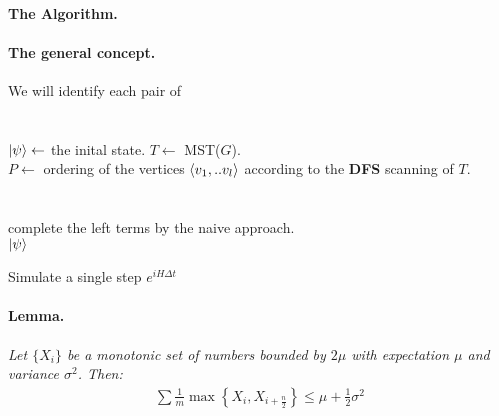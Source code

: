 \documentclass{article}
\begin{document}
\begin{multicols*}{2}
\paragraph{The Algorithm.}

\paragraph{The general concept.} We will identify each pair of  


\paragraph{}

\begin{algorithm}[H]
\SetAlgoLined
\ \\ 
\( \ket{\psi} \leftarrow \) the inital state.
 \(T  \leftarrow\) MST(\(G\)). \\
 \(P \leftarrow \) ordering of the vertices \( \braket{v_{1} , .. v_{l}}\) according to the \textbf{DFS} scanning of \(T\). \\
 \ \\ 
 \ \\
 complete the left terms by the naive approach. \\
 \Return \( \ket{\psi} \)
 \caption{Simulate a single step \(e^{iH\Delta t}\)}
\end{algorithm}


\paragraph{Lemma.} \textit{Let \(\{X_{i}\}\) be a monotonic set of numbers bounded by \(2\mu\) with expectation \( \mu \) and variance \( \sigma^2 \). Then:}
\begin{equation*}
    \begin{split}
        \sum{ \frac{1}{m}\max{ \left\{ X_{i}, X_{i+ \frac{n}{2}} \right\} } } \le \mu + \frac{1}{2}\sigma^2  
    \end{split}
\end{equation*}

\end{multicols*}
\end{document}
